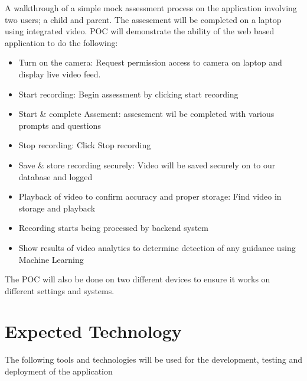 \documentclass{article}
\begin{document}
A walkthrough of a simple mock assessment process on the application involving two users; a child and parent. The assesement will be completed on a laptop using integrated video. POC will demonstrate the ability of the web based application to do the following: \\
\begin{itemize}
  \item Turn on the camera: Request permission access to camera on laptop and display live video feed.
  \item Start recording: Begin assessment by clicking start recording
  \item Start \& complete Assement: assesement wil be completed with various prompts and questions
  \item Stop recording: Click Stop recording
  \item Save \& store recording securely: Video will be saved securely on to our database and logged
  \item Playback of video to confirm accuracy and proper storage: Find video in storage and playback
  \item Recording starts being processed by backend system
  \item Show results of video analytics to determine detection of any guidance using Machine Learning
\end{itemize}

The POC will also be done on two different devices to ensure it works on different settings and systems.

\pagebreak

\section{Expected Technology}

The following tools and technologies will be used for the development, testing and deployment of the application 
\end{document}
